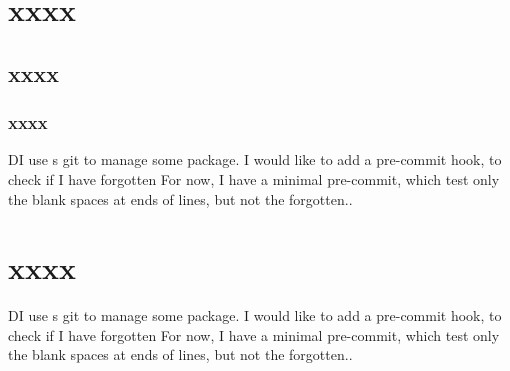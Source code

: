 \documentclass[a4paper, oneside, 12pt]{book}
\begin{document}
\section{xxxx}
\subsection{xxxx}
\subsubsection{xxxx}
DI use s git to manage some package.
I would like to add a pre-commit hook, to check if I have forgotten
For now, I have a minimal pre-commit, which test only the blank spaces at ends of lines, but not the forgotten..
\section{xxxx}

DI use s git to manage some package.
I would like to add a pre-commit hook, to check if I have forgotten
For now, I have a minimal pre-commit, which test only the blank spaces at ends of lines, but not the forgotten..
\end{document}
